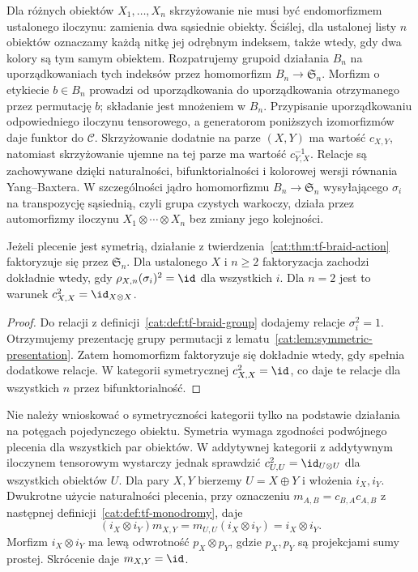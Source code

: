 Dla różnych obiektów $X_1,\ldots,X_n$ skrzyżowanie nie musi być endomorfizmem ustalonego iloczynu: zamienia dwa sąsiednie obiekty. Ściślej, dla ustalonej listy $n$ obiektów oznaczamy każdą nitkę jej odrębnym indeksem, także wtedy, gdy dwa kolory są tym samym obiektem. Rozpatrujemy grupoid działania $B_n$ na uporządkowaniach tych indeksów przez homomorfizm $B_n\to\mathfrak S_n$. Morfizm o etykiecie $b\in B_n$ prowadzi od uporządkowania do uporządkowania otrzymanego przez permutację $b$; składanie jest mnożeniem w $B_n$. Przypisanie uporządkowaniu odpowiedniego iloczynu tensorowego, a generatorom poniższych izomorfizmów daje funktor do $\mathcal C$. Skrzyżowanie dodatnie na parze $(X,Y)$ ma wartość $c_{X,Y}$, natomiast skrzyżowanie ujemne na tej parze ma wartość $c_{Y,X}^{-1}$. Relacje są zachowywane dzięki naturalności, bifunktorialności i kolorowej wersji równania Yang--Baxtera. W szczególności jądro homomorfizmu $B_n\to\mathfrak S_n$ wysyłającego $\sigma_i$ na transpozycję sąsiednią, czyli grupa czystych warkoczy, działa przez automorfizmy iloczynu $X_1\otimes\cdots\otimes X_n$ bez zmiany jego kolejności.

\begin{wniosek}\label{cat:cor:tf-symmetric-action}
Jeżeli plecenie jest symetrią, działanie z twierdzenia~\ref{cat:thm:tf-braid-action} faktoryzuje się przez $\mathfrak S_n$. Dla ustalonego $X$ i $n\geq2$ faktoryzacja zachodzi dokładnie wtedy, gdy $\rho_{X,n}(\sigma_i)^2=\id$ dla wszystkich $i$. Dla $n=2$ jest to warunek $c_{X,X}^2=\id_{X\otimes X}$.
\end{wniosek}
\begin{proof}
Do relacji z definicji~\ref{cat:def:tf-braid-group} dodajemy relacje $\sigma_i^2=1$. Otrzymujemy prezentację grupy permutacji z lematu~\ref{cat:lem:symmetric-presentation}. Zatem homomorfizm faktoryzuje się dokładnie wtedy, gdy spełnia dodatkowe relacje. W kategorii symetrycznej $c_{X,X}^2=\id$, co daje te relacje dla wszystkich $n$ przez bifunktorialność.
\end{proof}

Nie należy wnioskować o symetryczności kategorii tylko na podstawie działania na potęgach pojedynczego obiektu. Symetria wymaga zgodności podwójnego plecenia dla wszystkich par obiektów. W addytywnej kategorii z addytywnym iloczynem tensorowym wystarczy jednak sprawdzić $c_{U,U}^2=\id_{U\otimes U}$ dla wszystkich obiektów $U$. Dla pary $X,Y$ bierzemy $U=X\oplus Y$ i włożenia $i_X,i_Y$. Dwukrotne użycie naturalności plecenia, przy oznaczeniu $m_{A,B}=c_{B,A}c_{A,B}$ z następnej definicji~\ref{cat:def:tf-monodromy}, daje
\[
 (i_X\otimes i_Y)m_{X,Y}
 =m_{U,U}(i_X\otimes i_Y)=i_X\otimes i_Y.
\]
Morfizm $i_X\otimes i_Y$ ma lewą odwrotność $p_X\otimes p_Y$, gdzie $p_X,p_Y$ są projekcjami sumy prostej. Skrócenie daje $m_{X,Y}=\id$.

